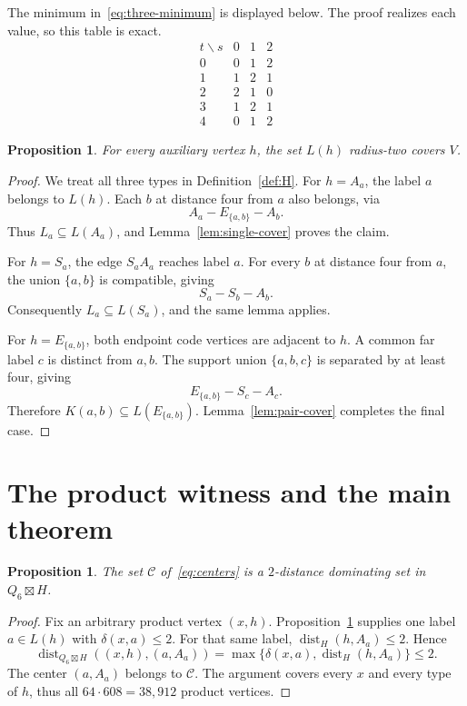 \documentclass[11pt]{article}
\newtheorem{proposition}[theorem]{Proposition}
\theoremstyle{definition}
\theoremstyle{remark}
\newcommand{\dist}{\operatorname{dist}}
\newcommand{\code}{\mathcal C}
\begin{document}
The minimum in~\eqref{eq:three-minimum} is displayed below.
The proof realizes each value, so this table is exact.
\[
\begin{array}{c|ccc}
 t\backslash s&0&1&2\\ \hline
 0&0&1&2\\
 1&1&2&1\\
 2&2&1&0\\
 3&1&2&1\\
 4&0&1&2
\end{array}
\]

\begin{proposition}\label{prop:label-cover}
For every auxiliary vertex \(h\), the set \(L(h)\) radius-two covers \(V\).
\end{proposition}
\begin{proof}
We treat all three types in Definition~\ref{def:H}.
For \(h=A_a\), the label \(a\) belongs to \(L(h)\).
Each \(b\) at distance four from \(a\) also belongs, via
\[
 A_a-E_{\{a,b\}}-A_b.
\]
Thus \(L_a\subseteq L(A_a)\), and
Lemma~\ref{lem:single-cover} proves the claim.

For \(h=S_a\), the edge \(S_aA_a\) reaches label \(a\).
For every \(b\) at distance four from \(a\), the union
\(\{a,b\}\) is compatible, giving
\[
 S_a-S_b-A_b.
\]
Consequently \(L_a\subseteq L(S_a)\), and the same lemma applies.

For \(h=E_{\{a,b\}}\), both endpoint code vertices are adjacent to \(h\).
A common far label \(c\) is distinct from \(a,b\). The support
union \(\{a,b,c\}\) is separated by at least four, giving
\[
 E_{\{a,b\}}-S_c-A_c.
\]
Therefore \(K(a,b)\subseteq L(E_{\{a,b\}})\).
Lemma~\ref{lem:pair-cover} completes the final case.
\end{proof}

\section{The product witness and the main theorem}\label{sec:main-proof}
\begin{proposition}\label{prop:domination}
The set \(\code\) of~\eqref{eq:centers} is a \(2\)-distance
dominating set in \(Q_6\boxtimes H\).
\end{proposition}
\begin{proof}
Fix an arbitrary product vertex \((x,h)\).
Proposition~\ref{prop:label-cover} supplies one label \(a\in L(h)\)
with \(\delta(x,a)\le2\). For that same label,
\(\dist_H(h,A_a)\le2\). Hence
\[
 \dist_{Q_6\boxtimes H}((x,h),(a,A_a))
    =\max\{\delta(x,a),\dist_H(h,A_a)\}\le2.
\]
The center \((a,A_a)\) belongs to \(\code\).
The argument covers every \(x\) and every type of \(h\),
thus all \(64\cdot608=38,912\) product vertices.
\end{proof}
\end{document}
